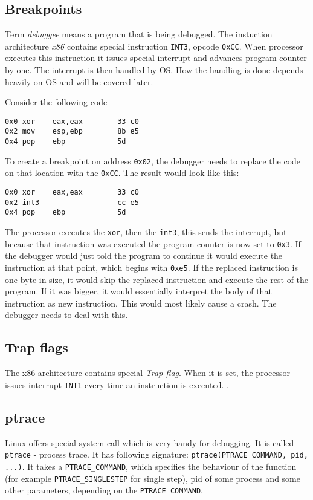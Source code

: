 \subsection{Breakpoints}
Term \textit{debuggee} means a program that is being debugged. The instuction architecture \textit{x86} contains special instruction \texttt{INT3}, opcode \texttt{0xCC}. When processor executes this instruction it issues special interrupt and advances program counter by one. The interrupt is then handled by OS. How the handling is done depends heavily on OS and will be covered later. 

Consider the following code 
\begin{verbatim}
0x0 xor    eax,eax        33 c0
0x2 mov    esp,ebp        8b e5
0x4 pop    ebp            5d
\end{verbatim}
To create a breakpoint on address \texttt{0x02}, the debugger needs to replace the code on that location with the \texttt{0xCC}. The result would look like this:
\begin{verbatim}
0x0 xor    eax,eax        33 c0
0x2 int3                  cc e5
0x4 pop    ebp            5d
\end{verbatim}
The processor executes the \texttt{xor}, then the \texttt{int3}, this sends the interrupt, but because that instruction was executed the program counter is now set to \texttt{0x3}. If the debugger would just told the program to continue it would execute the instruction at that point, which begins with \texttt{0xe5}. If the replaced instruction is one byte in size, it would skip the replaced instruction and execute the rest of the program. If it was bigger, it would essentially interpret the body of that instruction as new instruction. This would most likely cause a crash. The debugger needs to deal with this. 

\subsection{Trap flags}
The x86 architecture contains special \textit{Trap flag}. When it is set, the processor issues interrupt \texttt{INT1} every time an instruction is executed. .

\subsection{ptrace}
Linux offers special system call which is very handy for debugging. It is called \texttt{ptrace} \cite{ptrace} - process trace. It has following signature: \texttt{ptrace(PTRACE_COMMAND, pid, ...)}. It takes a \texttt{PTRACE_COMMAND}, which specifies the behaviour of the function (for example \texttt{PTRACE_SINGLESTEP} for single step), pid of some process and some other parameters, depending on the \texttt{PTRACE_COMMAND}. 

